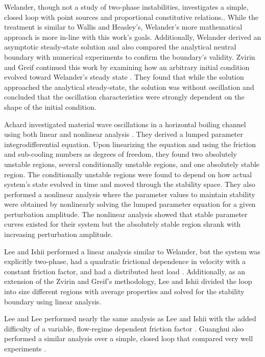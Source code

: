 Welander, though not a study of two-phase instabilities, investigates a simple, closed loop with point sources and proportional constitutive relations.\cite{welander_oscillatory_1967}.
While the treatment is similar to Wallis and Heasley's, Welander's more mathematical approach is more in-line with this work's goals.
Additionally, Welander derived an asymptotic steady-state solution and also compared the analytical neutral boundary with numerical experiments to confirm the boundary's validity.
Zvirin and Greif continued this work by examining how an arbitrary initial condition evolved toward Welander's steady state \cite{zvirin_transient_1979}.
They found that while the solution approached the analytical steady-state, the solution was without oscillation and concluded that the oscillation characteristics were strongly dependent on the shape of the initial condition.

Achard \etal investigated material wave oscillations in a horizontal boiling channel using both linear and nonlinear analysis \cite{achard_analysis_1985}.
They derived a lumped parameter integrodifferential equation.
Upon linearizing the equation and using the friction and sub-cooling numbers as degrees of freedom, they found two absolutely unstable regions, several conditionally unstable regions, and one absolutely stable region.
The conditionally unstable regions were found to depend on how actual system's state evolved in time and moved through the stability space.
They also performed a nonlinear analysis where the parameter values to maintain stability were obtained by nonlinearly solving the lumped parameter equation for a given perturbation amplitude.
The nonlinear analysis showed that stable parameter curves existed for their system but the absolutely stable region shrank with increasing perturbation amplitude.

Lee and Ishii performed a linear analysis similar to Welander, but the system was explicitly two-phase, had a quadratic frictional dependence in velocity with a constant friction factor, and had a distributed heat load \cite{sangyonglee_thermally_1990}.
Additionally, as an extension of the Zvirin and Greif's methodology, Lee and Ishii divided the loop into size different regions with average properties and solved for the stability boundary using linear analysis.

Lee and Lee performed nearly the same analysis as Lee and Ishii with the added difficulty of a variable, flow-regime dependent friction factor \cite{lee_linear_1991}.
Guanghui \etal also performed a similar analysis over a simple, closed loop that compared very well experiments \cite{guanghui_theoretical_2002}.

